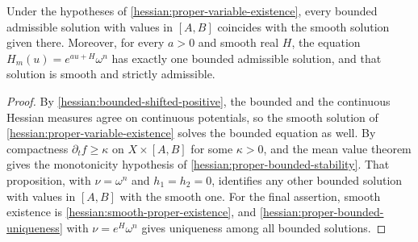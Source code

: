 \begin{corollary}\label{hessian:proper-bounded-smoothness}
Under the hypotheses of \cref{hessian:proper-variable-existence},
every bounded admissible solution with values in $[A,B]$ coincides
with the smooth solution given there. Moreover, for every $a>0$ and smooth real
$H$, the equation $H_m(u)=e^{au+H}\omega^n$ has exactly one bounded
admissible solution, and that solution is smooth and strictly
admissible.
\end{corollary}
\begin{proof}
By \cref{hessian:bounded-shifted-positive}, the bounded and the
continuous Hessian measures agree on continuous potentials, so the
smooth solution of \cref{hessian:proper-variable-existence} solves the
bounded equation as well. By compactness $\partial_tf\geq\kappa$ on
$X\times[A,B]$ for some $\kappa>0$, and the mean value theorem gives the
monotonicity hypothesis of \cref{hessian:proper-bounded-stability}.
That proposition, with $\nu=\omega^n$ and $h_1=h_2=0$, identifies any
other bounded solution with values in $[A,B]$ with the smooth one. For
the final assertion, smooth existence is
\cref{hessian:smooth-proper-existence}, and
\cref{hessian:proper-bounded-uniqueness} with $\nu=e^H\omega^n$ gives
uniqueness among all bounded solutions.
\end{proof}
